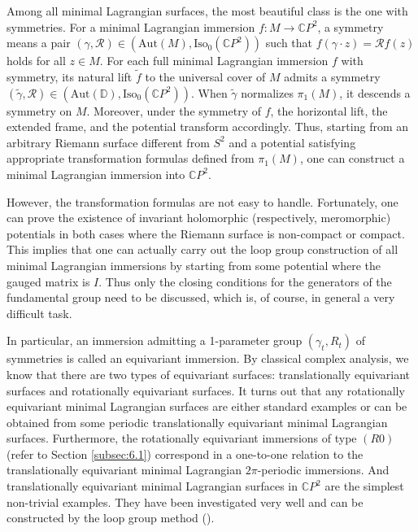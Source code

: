 \documentclass[a4paper,11pt]{amsart}
\theoremstyle{definition}
\numberwithin{equation}{section}
\newcommand{\C}{\mathbb{C}}
\begin{document}
Among all minimal Lagrangian surfaces, the most beautiful class is the one with symmetries.
For a minimal Lagrangian immersion $f: M\rightarrow \mathbb{C} P^2$,  a symmetry means a pair $(\gamma, \mathcal{R}) \in
(\mathrm{Aut}(M), \mathrm{Iso}_0(\mathbb{C} P^2))$ such that 
$f(\gamma \cdot z) = \mathcal{R}  f(z)$ holds for all $z \in M$.  For each full minimal Lagrangian immersion $f$ with symmetry, its natural lift  $\tilde{f}$ to the universal cover of $M$ admits a symmetry $(\tilde{\gamma}, \mathcal{R})\in (\mathrm{Aut}(\mathbb{D}), \mathrm{Iso}_0(\mathbb{C} P^2))$. When $\tilde{\gamma}$ normalizes $\pi_1(M)$,  it descends a symmetry on $M$.  Moreover, under the symmetry of $f$, the horizontal lift, the extended frame, and the potential transform accordingly. Thus, starting from an arbitrary Riemann surface  different from $S^2$ and a  potential satisfying appropriate transformation formulas defined from $\pi_1(M)$, one can construct a minimal Lagrangian immersion into $\C P^2$. 

However, the transformation formulas are not easy to handle. Fortunately, one can prove the existence of invariant holomorphic (respectively, meromorphic) potentials in both cases where the Riemann surface is non-compact or compact.
This implies that one can actually carry out the loop group construction of all minimal Lagrangian immersions by starting from some potential where the gauged matrix is $I$. 
 Thus only the closing conditions for the generators of the fundamental group need to be discussed, which is, of course, in general a very difficult task.

In particular, an immersion admitting  a 1-parameter group $(\gamma_t, R_t)$ of symmetries is called an equivariant immersion. By classical complex analysis, we know that there are two types of equivariant surfaces:  translationally equivariant surfaces and rotationally equivariant surfaces. It turns out that any rotationally equivariant minimal Lagrangian surfaces are either standard examples or  can be obtained from some periodic translationally equivariant minimal Lagrangian surfaces. Furthermore, the rotationally equivariant immersions of type $(R0)$ (refer to Section \ref{subsec:6.1}) correspond in a one-to-one relation to the translationally equivariant minimal Lagrangian $2 \pi$-periodic immersions.
And translationally equivariant minimal Lagrangian surfaces in $\C P^2$ are the simplest non-trivial examples. They have been investigated very well and can be constructed by the loop group method (\cite{DoMaNL, DoMaEX}). 
\end{document}
